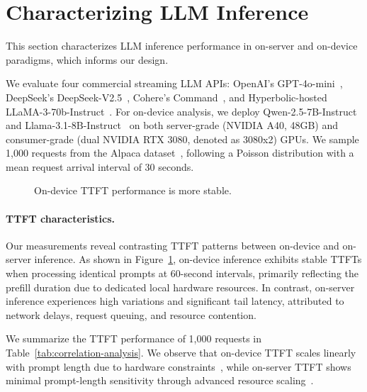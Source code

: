 \section{Characterizing LLM Inference}
\label{sec:characteristics}
This section characterizes LLM inference performance in on-server and on-device paradigms, which informs our design.

We evaluate four commercial streaming LLM APIs: OpenAI's GPT-4o-mini~\citep{gpt-4o-mini}, DeepSeek's DeepSeek-V2.5~\citep{deepseek-v2_5}, Cohere's Command~\citep{command}, and Hyperbolic-hosted LLaMA-3-70b-Instruct~\citep{llama3-70b}. For on-device analysis, we deploy Qwen-2.5-7B-Instruct~\citep{qwen2_5} and Llama-3.1-8B-Instruct~\citep{grattafiori2024llama3herdmodels} on both server-grade (NVIDIA A40, 48GB) and consumer-grade (dual NVIDIA RTX 3080, denoted as 3080x2) GPUs. 
We sample 1,000 requests from the Alpaca dataset~\citep{alpaca}, following a Poisson distribution with a mean request arrival interval of 30 seconds.

\begin{figure}
    \hfill
    \caption{On-device TTFT performance is more stable.}
    \label{fig:ttft_repeat}
\end{figure}

\paragraph{TTFT characteristics.} 
Our measurements reveal contrasting TTFT patterns between on-device and on-server inference. As shown in Figure~\ref{fig:ttft_repeat}, on-device inference exhibits stable TTFTs when processing identical prompts at 60-second intervals, primarily reflecting the prefill duration due to dedicated local hardware resources. In contrast, on-server inference experiences high variations and significant tail latency, attributed to network delays, request queuing, and resource contention.

We summarize the TTFT performance of 1,000 requests in Table~\ref{tab:correlation-analysis}. We observe that on-device TTFT scales linearly with prompt length due to hardware constraints~\citep{edgebenchmark}, while on-server TTFT shows minimal prompt-length sensitivity through advanced resource scaling~\citep{distserve,splitwise,memserve}.

